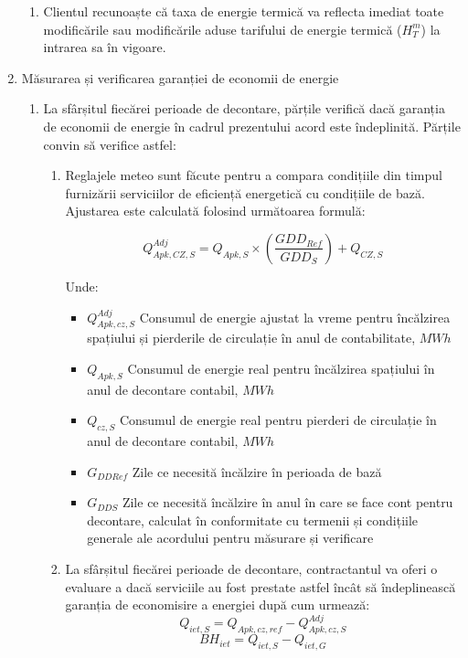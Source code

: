 \begin{enumerate}
\begin{enumerate}
  \item Clientul recunoaște că taxa de energie termică va reflecta imediat toate modificările sau modificările aduse tarifului de energie termică ($H_{T}^{m}$) la intrarea sa în vigoare.

  \end{enumerate}

\item Măsurarea și verificarea garanției de economii de energie

  \begin{enumerate}
  \item La sfârșitul fiecărei perioade de decontare, părțile verifică dacă garanția de economii de energie în cadrul prezentului acord este îndeplinită. Părțile convin să verifice astfel:

    \begin{enumerate}

    \item Reglajele meteo sunt făcute pentru a compara condițiile din timpul furnizării serviciilor de eficiență energetică cu condițiile de bază. Ajustarea este calculată folosind următoarea formulă:

      \[ Q^{Adj}_{Apk,CZ,S} = Q_{Apk,S} \times \left( \frac{GDD_{Ref}}{GDD_S}\right) + Q_{CZ,S} \]

      Unde:
      \begin{itemize}[label={}]
	\item $Q_{Apk,cz,S}^{Adj}$ \quad Consumul de energie ajustat la vreme pentru încălzirea spațiului și pierderile de circulație în anul de contabilitate, $MWh$
	\item $Q_{Apk,S}$ \quad Consumul de energie real pentru încălzirea spațiului în anul de decontare contabil, $MWh$
        \item $Q_{cz,S}$ \quad Consumul de energie real pentru pierderi de circulație în anul de decontare contabil, $MWh$
        \item $G_{DDRef}$ \quad Zile ce necesită  încălzire în perioada de bază
        \item $G_{DDS}$ \quad Zile ce necesită încălzire în anul în care se face cont pentru decontare, calculat în conformitate cu termenii și condițiile generale ale acordului pentru măsurare și verificare
\end{itemize}

    \item La sfârșitul fiecărei perioade de decontare, contractantul va oferi o evaluare a dacă serviciile au fost prestate astfel încât să îndeplinească garanția de economisire a energiei după cum urmează:
\[ Q_{iet,S} = Q_{Apk,cz,ref} - Q^{Adj}_{Apk,cz,S} \]
\[ BH_{iet} = Q_{iet,S} - Q_{iet,G} \]


\end{enumerate}
\end{enumerate}
\end{enumerate}
